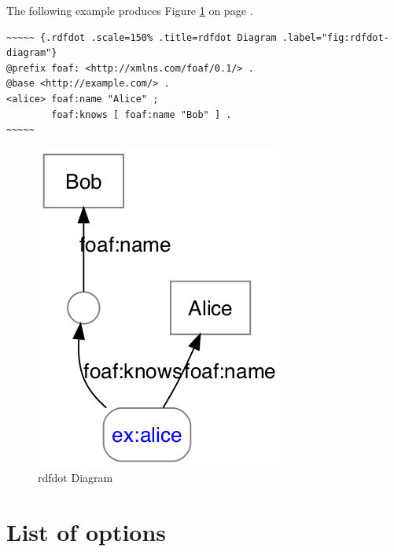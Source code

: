 \documentclass[]{article}
\begin{document}
The following example produces Figure \ref{"fig:rdfdot-diagram"} on page
\pageref{"fig:rdfdot-diagram"}.

\scriptsize

\begin{verbatim}
~~~~~ {.rdfdot .scale=150% .title=rdfdot Diagram .label="fig:rdfdot-diagram"}
@prefix foaf: <http://xmlns.com/foaf/0.1/> .
@base <http://example.com/> .
<alice> foaf:name "Alice" ;
        foaf:knows [ foaf:name "Bob" ] .
~~~~~
\end{verbatim}

\normalsize

\begin{figure}[htbp]
\centering
\includegraphics{tmp/ppp-render-_6_eB/image-11.png}
\caption{rdfdot Diagram\label{"fig:rdfdot-diagram"}}
\end{figure}

\newpage

\section{List of options}\label{list-of-options}
\end{document}
